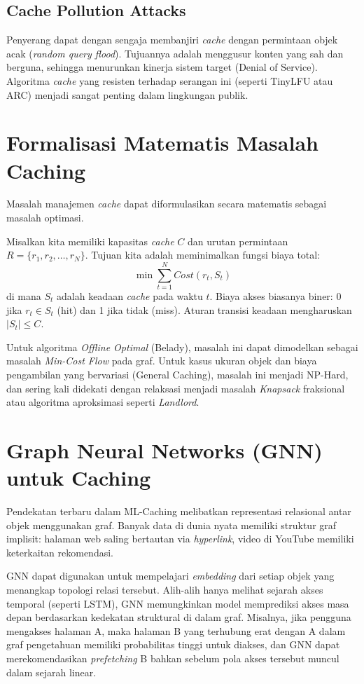 \subsection{Cache Pollution Attacks}
Penyerang dapat dengan sengaja membanjiri \textit{cache} dengan
permintaan objek acak (\textit{random query flood}). Tujuannya adalah
menggusur konten yang sah dan berguna, sehingga menurunkan kinerja sistem
target (Denial of Service). Algoritma \textit{cache} yang resisten terhadap
serangan ini (seperti TinyLFU atau ARC) menjadi sangat penting dalam
lingkungan publik.

\section{Formalisasi Matematis Masalah Caching}
Masalah manajemen \textit{cache} dapat diformulasikan secara matematis
sebagai masalah optimasi.

Misalkan kita memiliki kapasitas \textit{cache} $C$ dan urutan permintaan
$R = \{r_1, r_2, \dots, r_N\}$. Tujuan kita adalah meminimalkan
fungsi biaya total:
\[ \min \sum_{t=1}^{N} Cost(r_t, S_t) \]
di mana $S_t$ adalah keadaan \textit{cache} pada waktu $t$.
Biaya akses biasanya biner: 0 jika $r_t \in S_t$ (hit) dan 1 jika tidak (miss).
Aturan transisi keadaan mengharuskan $|S_t| \le C$.

Untuk algoritma \textit{Offline Optimal} (Belady), masalah ini dapat
dimodelkan sebagai masalah \textit{Min-Cost Flow} pada graf.
Untuk kasus ukuran objek dan biaya pengambilan yang bervariasi
(General Caching),
masalah ini menjadi NP-Hard, dan sering kali didekati dengan relaksasi
menjadi masalah \textit{Knapsack} fraksional atau algoritma aproksimasi
seperti \textit{Landlord}.

\section{Graph Neural Networks (GNN) untuk Caching}
Pendekatan terbaru dalam ML-Caching melibatkan representasi relasional
antar objek menggunakan graf.
Banyak data di dunia nyata memiliki struktur graf implisit: halaman web
saling bertautan via \textit{hyperlink}, video di YouTube memiliki
keterkaitan rekomendasi.

GNN dapat digunakan untuk mempelajari \textit{embedding} dari setiap objek
yang menangkap topologi relasi tersebut.
Alih-alih hanya melihat sejarah akses temporal (seperti LSTM), GNN
memungkinkan model memprediksi akses masa depan berdasarkan kedekatan
struktural di dalam graf. Misalnya, jika pengguna mengakses halaman A,
maka halaman B yang terhubung erat dengan A dalam graf pengetahuan
memiliki probabilitas tinggi untuk diakses, dan GNN dapat merekomendasikan
\textit{prefetching} B bahkan sebelum pola akses tersebut muncul
dalam sejarah linear.

